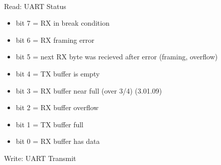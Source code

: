 \\
Read: UART Status\\
\begin{itemize}
\item[] bit 7 = RX in break condition
\item[] bit 6 = RX framing error
\item[] bit 5 = next RX byte was recieved after error (framing, overflow)
\item[] bit 4 = TX buffer is empty
\item[] bit 3 = RX buffer near full (over 3/4) (3.01.09)
\item[] bit 2 = RX buffer overflow
\item[] bit 1 = TX buffer full
\item[] bit 0 = RX buffer has data
\end{itemize}
Write: UART Transmit


